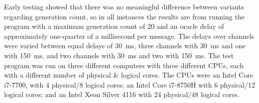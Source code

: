 Early testing showed that there was no meaningful difference between variants
regarding generation count, so in all instances the results are from running the program with a maximum generation count of \num{20} and an oracle delay of approximately one-quarter of a millisecond per message.  The delays over channels were varied between equal delays of \qty{30}{\milli\second}, three channels with \qty{30}{\milli\second} and one with \qty{150}{\milli\second}, and two channels with \qty{30}{\milli\second} and two with \qty{150}{\milli\second}.  The test program was run on three different computers with three different CPUs, each with a different number of physical \& logical cores.  The CPUs were an Intel\textsuperscript{\textregistered} Core\textsuperscript{\texttrademark} i7-7700, with 4 physical/8 logical cores; an Intel\textsuperscript{\textregistered} Core\textsuperscript{\texttrademark} i7-8750H with 6 physical/12 logical cores; and an Intel\textsuperscript{\textregistered} Xeon\textsuperscript{\textregistered} Silver 4116 with 24 physical/48 logical cores.

\begin{table}
\centering
{}
\caption[Mean recorded running times for each  variant on an 8-core CPU]{Mean recorded running times in milliseconds for each \gls{nmp} variant in a simulation, with different sending delay lengths, on a computer with a CPU with 4/8 physical/logical cores}
\label{tab:nmp:simulation8cores}
\end{table}

